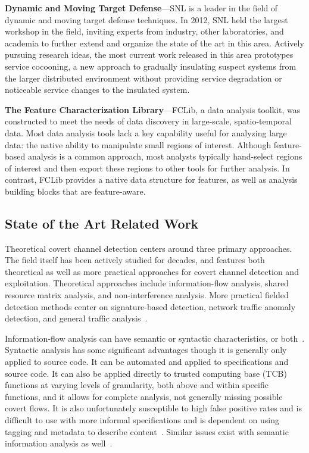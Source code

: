 \documentclass{sbir}
\begin{document}
{\bf Dynamic and Moving Target Defense}---SNL is a leader in the field of dynamic and moving target defense techniques. In 2012, SNL held the largest workshop in the field, inviting experts from industry, other laboratories, and academia to further extend and organize the state of the art in this area. Actively pursuing research ideas, the most current work released in this area prototypes service cocooning, a new approach to gradually insulating suspect systems from the larger distributed environment without providing service degradation or noticeable service changes to the insulated system.

{\bf The Feature Characterization Library}---FCLib, a data analysis toolkit, was constructed to meet the needs of data discovery in large-scale, spatio-temporal data. Most data analysis tools lack a key capability useful for analyzing large data: the native ability to manipulate small regions of interest. Although feature-based analysis is a common approach, most analysts typically hand-select regions of interest and then export these regions to other tools for further analysis. In contrast, FCLib provides a native data structure for features, as well as analysis building blocks that are feature-aware.

\subsection{State of the Art Related Work}
Theoretical covert channel detection centers around three primary approaches. The field itself has been actively studied for decades, and features both theoretical as well as more practical approaches for covert channel detection and exploitation. Theoretical approaches include information-flow analysis, shared resource matrix analysis, and non-interference analysis. More practical fielded detection methods center on signature-based detection, network traffic anomaly detection, and general traffic analysis~\cite{Couture10}.

Information-flow analysis can have semantic or syntactic characteristics, or both~\cite{Feiertag80,Rushby84,Mchugh01,Mchugh88,Millen78,Millen81}. Syntactic analysis has some significant advantages though it is generally only applied to source code. It can be automated and applied to specifications and source code. It can also be applied directly to trusted computing base (TCB) functions at varying levels of granularity, both above and within specific functions, and it allows for complete analysis, not generally missing possible covert flows. It is also unfortunately susceptible to high false positive rates and is difficult to use with more informal specifications and is dependent on using tagging and metadata to describe content~\cite{Gligor93}. Similar issues exist with semantic information analysis as well~\cite{Tsai90,He90}.
\end{document}
